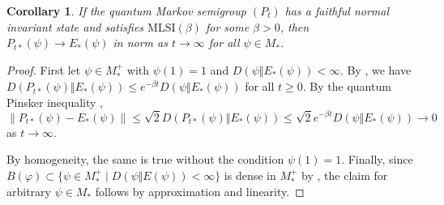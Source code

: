 \documentclass[12pt,a4paper]{amsart}
\newcommand{\1}{\mathds{1}}
\renewcommand{\phi}{\varphi}
\newcommand{\norm}[1]{\lVert#1\rVert}
\theoremstyle{plain}
\newtheorem{corollary}[proposition]{Corollary}
\theoremstyle{definition}
\theoremstyle{remark}
\begin{document}
\begin{corollary}
    If the quantum Markov semigroup $(P_t)$ has a faithful normal invariant state and satisfies $\mathrm{MLSI}(\beta)$ for some $\beta>0$, then $P_{t\ast}(\psi)\to E_\ast(\psi)$ in norm as $t\to \infty$ for all $\psi\in M_\ast$.
\end{corollary}
\begin{proof}
    First let $\psi\in M_\ast^+$ with $\psi(1)=1$ and $D(\psi\Vert E_\ast(\psi))<\infty$. By , we have $D(P_{t\ast}(\psi)\Vert E_\ast(\psi))\leq e^{-\beta t}D(\psi\Vert E_\ast(\psi))$ for all $t\geq 0$. By the quantum Pinsker inequality \cite[Theorem 3.1]{HOT81},
    \begin{equation*}
        \norm{P_{t\ast}(\psi)-E_\ast(\psi)}\leq \sqrt 2D(P_{t\ast}(\psi)\Vert E_\ast(\psi))\leq \sqrt 2 e^{-\beta t}D(\psi\Vert E_\ast(\psi))\to 0
    \end{equation*}
    as $t\to \infty$.

    By homogeneity, the same is true without the condition $\psi(1)=1$. Finally, since $B(\phi)\subset \{\psi\in M_\ast^+\mid D(\psi\Vert E(\psi))<\infty\}$ is dense in $M_\ast^+$ by , the claim for arbitrary $\psi\in M_\ast$ follows by approximation and linearity.
\end{proof}
\end{document}
